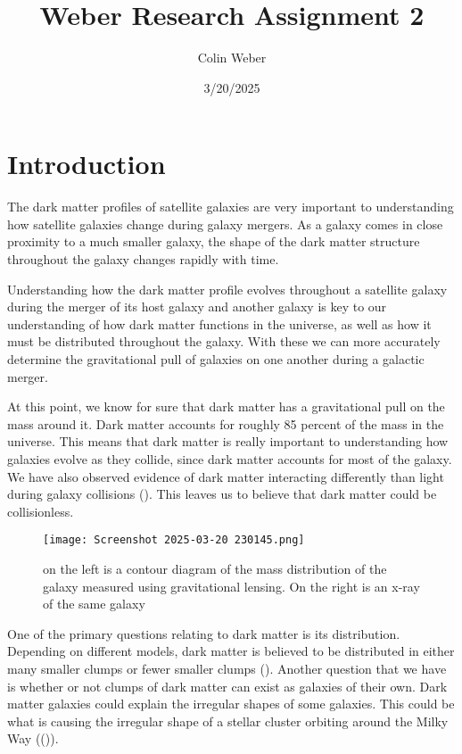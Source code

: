 \documentclass[fleqn,usenatbib]{mnras}
\title[Short title, max. 45 characters]{Weber Research Assignment 2}
\author{Colin Weber}
\date{3/20/2025}
\begin{document}
\label{firstpage}
\pagerange{\pageref{firstpage}--\pageref{lastpage}}
\maketitle


\section{Introduction}

The dark matter profiles of satellite galaxies are very important to understanding how satellite galaxies change during galaxy mergers. As a galaxy comes in close proximity to a much smaller galaxy, the shape of the dark matter structure throughout the galaxy changes rapidly with time.


        Understanding how the dark matter profile evolves throughout a satellite galaxy during the merger of its host galaxy and another galaxy is key to our understanding of how dark matter functions in the universe, as well as how it must be distributed throughout the galaxy. With these we can more accurately determine the gravitational pull of galaxies on one another during a galactic merger.

        At this point, we know for sure that dark matter has a gravitational pull on the mass around it. Dark matter accounts for roughly 85 percent of the mass in the universe. This means that dark matter is really important to understanding how galaxies evolve as they collide, since dark matter accounts for most of the galaxy. We have also observed evidence of dark matter interacting differently than light during galaxy collisions (\citet{Clowe2006}). This leaves us to believe that dark matter could be collisionless.
        
\begin{figure}
                \centering
                \texttt{[image: Screenshot 2025-03-20 230145.png]}
                \label{fig:enter-label}
            \caption{on the left is a contour diagram of the mass distribution of the galaxy measured using gravitational lensing. On the right is an x-ray of the same galaxy}
            \end{figure}
                        

        One of the primary questions relating to dark matter is its distribution. Depending on different models, dark matter is believed to be distributed in either many smaller clumps or fewer smaller clumps (\citet{Banik2018}). Another question that we have is whether or not clumps of dark matter can exist as galaxies of their own. Dark matter galaxies could explain the irregular shapes of some galaxies. This could be what is causing the irregular shape of a stellar cluster orbiting around the Milky Way ((\citet{Erkal2017})).
\end{document}
